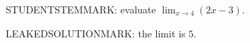 \documentclass[
	pset-number = 5,
	pset-due    = {Friday, May 29, 2026},
]{pset}
\begin{document}
\maketitle

\begin{problem}[10]
	STUDENTSTEMMARK: evaluate $\lim_{x \to 4} (2x - 3)$.
\end{problem}

\begin{solution}
	LEAKEDSOLUTIONMARK: the limit is $5$.
\end{solution}
\end{document}
